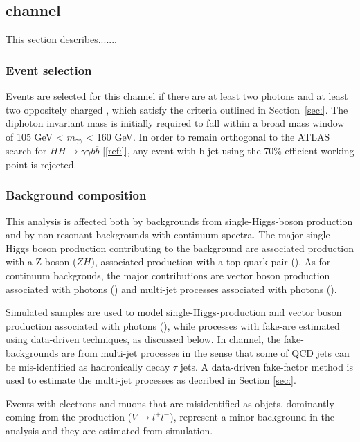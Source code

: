 \subsection{\yytwotau channel}{\Large\bfseries}
\label{sec:yy2taus}

This section describes.......

\subsubsection{Event selection}

Events are selected for this channel if there are at least two photons and at least two oppositely charged \tauh, which satisfy the criteria outlined in Section~\ref{sec:}. The diphoton invariant mass is initially required to fall within a broad mass window of 105 GeV < $m_{\gamma\gamma}$ < 160 GeV. In order to remain orthogonal to the ATLAS search for $HH \rightarrow \gamma\gamma$$b\overline{b}$ [\ref{ref:}], any event with b-jet using the 70\% efficient working point is rejected.

\subsubsection{Background composition}

This analysis is affected both by backgrounds from single-Higgs-boson production and by non-resonant backgrounds with continuum \myy spectra. The major single Higgs boson production contributing to the background are associated production with a Z boson ($ZH$), associated production with a top quark pair (\ttH). As for continuum backgrouds, the major contributions are vector boson production associated with photons (\Vyy) and multi-jet processes associated with photons (\yyjet).

Simulated samples are used to model single-Higgs-production and vector boson production associated with photons (\Vyy), while processes with fake-\tauh are estimated using data-driven techniques, as discussed below. In \yytwotau channel, the fake-\tauh backgrounds are from multi-jet processes in the sense that some of QCD jets can be mis-identified as hadronically decay $\tau$ jets. A data-driven fake-factor method is used to estimate the multi-jet processes as decribed in Section \ref{sec:}.

Events with electrons and muons that are misidentified as \tauh objets, dominantly coming from the \Vyy production ($V \rightarrow l^+l^-$), represent a minor background in the analysis and they are estimated from simulation.

